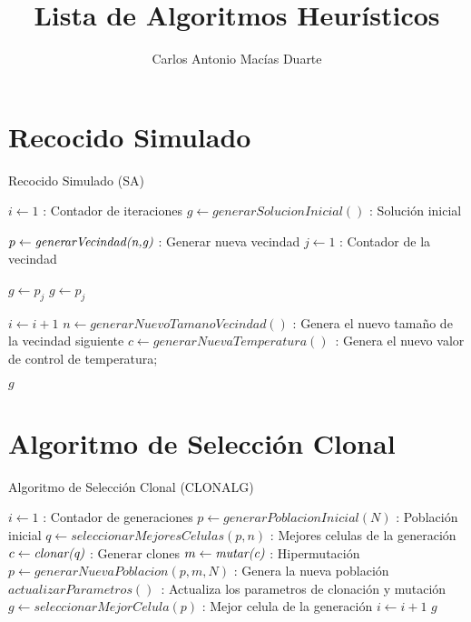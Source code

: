 \documentclass[10pt,letterpaper,twoside,openright]{article}
\author{Carlos Antonio Macías Duarte}
\title{Lista de Algoritmos Heurísticos}
\begin{document}
	\maketitle
			
	\section{Recocido Simulado}
	
		\begin{algorithm}[H]
			\caption{Recocido Simulado (SA)}
				$ i \leftarrow 1 $ : Contador de iteraciones\;
				$ g \leftarrow generarSolucionInicial() $ : Solución inicial\;
				{
					$ p \leftarrow \emph{generarVecindad(n,g)}$ : Generar nueva vecindad\;
					$ j \leftarrow 1 $ : Contador de la vecindad\;
					{
						{
							$ g \leftarrow p_{j} $\;
						}
						{
							$ g \leftarrow p_{j} $\;
						}
						
					}			
					$ i \leftarrow  i + 1 $\;
					$ n \leftarrow  generarNuevoTamanoVecindad() $ : Genera el nuevo tamaño de la vecindad siguiente\;
					$ c \leftarrow  generarNuevaTemperatura() $\ :  Genera el nuevo valor de control de temperatura;
				}
		 		\Return $ g $
		 \end{algorithm}
		 
			
	\section{Algoritmo de Selección Clonal}
	
		\begin{algorithm}[H]
			\caption{Algoritmo de Selección Clonal (CLONALG)}
				$ i \leftarrow 1 $ : Contador de generaciones\;
				$ p \leftarrow generarPoblacionInicial(N) $ : Población inicial\;
				{
					$ q \leftarrow seleccionarMejoresCelulas(p, n) $ : Mejores celulas de la generación\;
					$ c \leftarrow \emph{clonar(q)}$ : Generar clones\;
					$ m \leftarrow \emph{mutar(c)}$ : Hipermutación\;
					$ p \leftarrow  generarNuevaPoblacion(p, m, N) $ : Genera la nueva población\;
					$actualizarParametros() $\ :  Actualiza los parametros de clonación y mutación\;
					$ g \leftarrow seleccionarMejorCelula(p) $ : Mejor celula de la generación\;
					$ i \leftarrow  i + 1 $\;
				}
		 		\Return $ g $
		 \end{algorithm}
	
\end{document}
